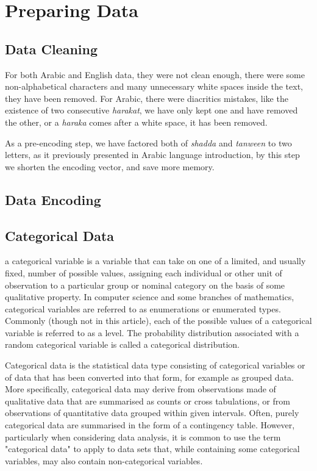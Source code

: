 \documentclass[12pt]{report}
\begin{document}
\section*{Preparing Data}


\subsection*{Data Cleaning}

For both Arabic and English data, they were not clean enough, there were some
non-alphabetical characters and many unnecessary white spaces inside the text,
they have been removed.  For Arabic, there were diacritics mistakes, like the
existence of two consecutive \textit{harakat}, we have only kept one and have
removed the other, or a \textit{haraka} comes after a white space, it has been
removed. 

As a pre-encoding step, we have factored both of \textit{shadda} and
\textit{tanween} to two letters, as it previously presented in Arabic language
introduction,  by this step we shorten the encoding vector, and save more memory.


\subsection*{Data Encoding}

\subsection*{Categorical Data}
a categorical variable is a variable that can take on one of a limited, and
usually fixed, number of possible values, assigning each individual or other unit
of observation to a particular group or nominal category on the basis of some
qualitative property. In computer science and some branches of mathematics,
categorical variables are referred to as enumerations or enumerated types.
Commonly (though not in this article), each of the possible values of a
categorical variable is referred to as a level. The probability distribution
associated with a random categorical variable is called a categorical
distribution.

Categorical data is the statistical data type consisting of categorical variables or of data that has been converted into that form, for example as grouped data. More specifically, categorical data may derive from observations made of qualitative data that are summarised as counts or cross tabulations, or from observations of quantitative data grouped within given intervals. Often, purely categorical data are summarised in the form of a contingency table. However, particularly when considering data analysis, it is common to use the term "categorical data" to apply to data sets that, while containing some categorical variables, may also contain non-categorical variables.
\end{document}
